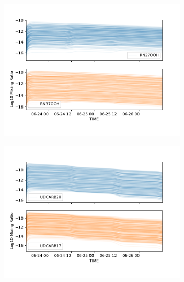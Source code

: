 \begin{figure}[H]
\begin{subfigure}[t]{.5\textwidth}
  \centering
  \includegraphics[width=\textwidth]{ensemble/RN27OOH-RN37OOH.pdf}
\end{subfigure}%
\begin{subfigure}[t]{.5\textwidth}
  \centering
  \includegraphics[width=\textwidth]{ensemble/UDCARB20-UDCARB17.pdf}
\end{subfigure}%


\end{figure}

